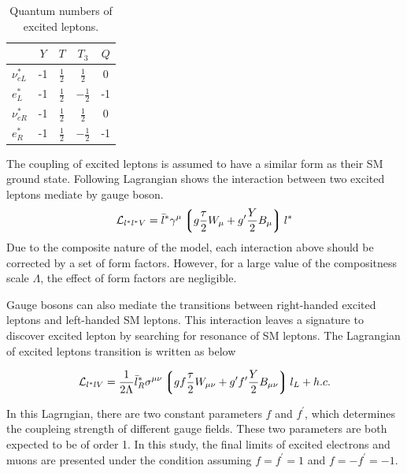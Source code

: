 \begin{table}[h!]
 \renewcommand{\arraystretch}{2}
 \addtolength{\tabcolsep}{5pt}
\begin{center}
\begin{tabular}{lcccc}
\hline 
\hline
 & $Y$ & $T$ & $T_{3}$ & $Q$ \\ 
\hline
$\nu_{e L}^{*}$ & -1 & $\frac{1}{2}$ & $\frac{1}{2}$ & 0 \\ 
$e^{*}_{L}$ & -1 & $\frac{1}{2}$ & $-\frac{1}{2}$ & -1 \\ 
$\nu_{e R}^{*}$ & -1 & $\frac{1}{2}$ & $\frac{1}{2}$ & 0 \\ 
$e^{*}_{R}$ & -1 & $\frac{1}{2}$ & $-\frac{1}{2}$ & -1 \\ 
\hline
\hline
\end{tabular}
\end{center}
\caption{\label{tab:qn}Quantum numbers of excited leptons.}
\end{table}

The coupling of excited leptons is assumed to have a similar form as their SM ground state. Following Lagrangian shows the interaction between two excited leptons mediate by gauge boson.
\begin{align}
 \mathcal{L}_{l^{*}l^{*}V} = \bar{l}^{*}\gamma^{\mu}\left\lgroup  g\frac{\tau}{2}W_{\mu} + g^{\prime}\frac{Y}{2}B_{\mu} \right\rgroup l^{*}
\end{align}
\noindent Due to the composite nature of the model, each interaction above should be corrected by a set of form factors. However, for a large value of the compositness scale $\Lambda$, the effect of form factors are negligible.

Gauge bosons can also mediate the transitions between right-handed excited leptons and left-handed SM leptons. This interaction leaves a signature to discover excited lepton by searching for resonance of SM leptons. The Lagrangian of excited leptons transition is written as below

\begin{align}
\mathcal{L}_{l^{*}lV} = \frac{1}{2\Lambda}\bar{l}_{R}^{*}\sigma^{\mu\nu} \left\lgroup gf\frac{\tau}{2}W_{\mu\nu} + g^{\prime}f^{\prime}\frac{Y}{2}B_{\mu\nu} \right\rgroup l_{L} + h.c.
\end{align}  

\noindent In this Lagrngian, there are two constant parameters $f$ and $f^{\prime}$, which determines the coupleing strength of different gauge fields. These two parameters are both expected to be of order 1. In this study, the final limits of excited electrons and muons are presented under the condition assuming $f = f^{\prime} = 1$ and $f = -f^{\prime} = -1$. 
 
